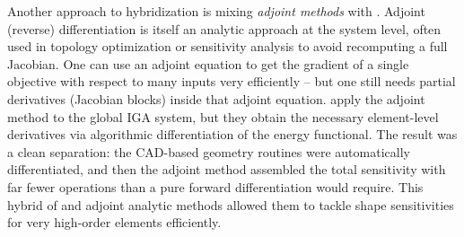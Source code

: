 Another approach to hybridization is mixing \emph{adjoint methods} with \autodiff{}. 
Adjoint (reverse) differentiation is itself an analytic approach at the system level, often used in topology optimization or sensitivity analysis to avoid recomputing a full Jacobian. 
One can use an adjoint equation to get the gradient of a single objective with respect to many inputs very efficiently -- but one still needs partial derivatives (Jacobian blocks) inside that adjoint equation. 
%
\cite{oberbichler2021efficient} apply the adjoint method to the global IGA
system, but they obtain the necessary
element-level derivatives via algorithmic differentiation of
the energy functional. 
The result was a clean separation: the
CAD-based geometry routines were automatically differentiated, and
then the adjoint method assembled the total sensitivity with far fewer
operations than a pure forward differentiation would require. This
hybrid of \autodiff{} and adjoint analytic methods allowed them to tackle shape
sensitivities for very high-order elements efficiently. 








